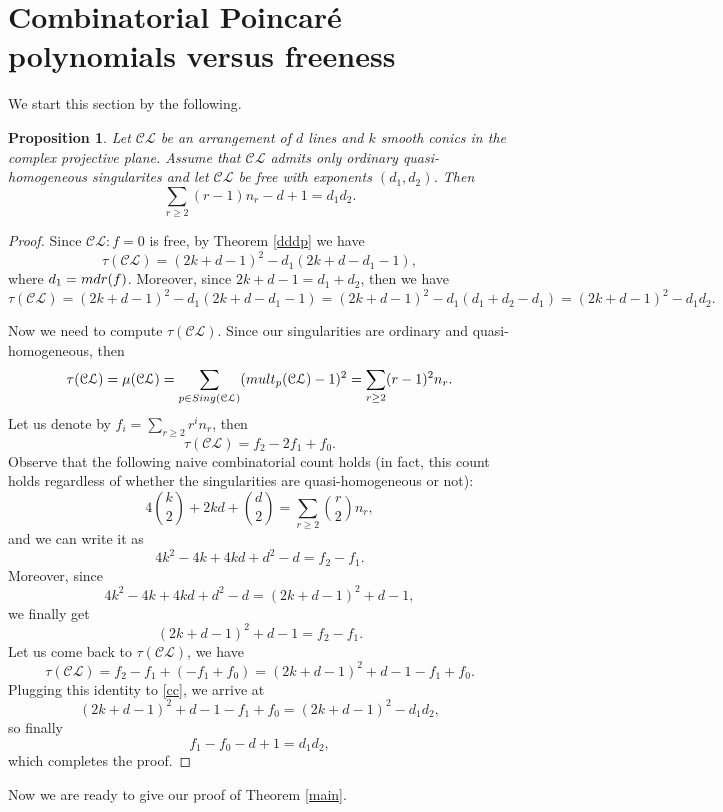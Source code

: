 \documentclass[12pt]{article}
\theoremstyle{plain}
\newtheorem{proposition}[thm]{Proposition}
\theoremstyle{definition}
\begin{document}
\section{Combinatorial Poincar\'e polynomials versus freeness}
We start this section by the following.
\begin{proposition}
\label{ccc}
Let $\mathcal{CL}$ be an arrangement of $d$ lines and $k$ smooth conics in the complex projective plane. Assume that $\mathcal{CL}$ admits only ordinary quasi-homogeneous singularites and let $\mathcal{CL}$ be free with exponents $(d_{1}, d_{2})$. Then
\begin{equation}
\sum_{r\geq 2}(r-1)n_{r} - d + 1 = d_{1}d_{2}.
\end{equation}
\end{proposition} 
\begin{proof}
Since $\mathcal{CL} : f = 0$ is free, by Theorem \ref{dddp} we have 
\begin{equation}
\label{cc}
\tau(\mathcal{CL}) = (2k+d-1)^{2} - d_{1}(2k+d-d_{1}-1),
\end{equation}
where $d_{1} = {\rm mdr}(f)$. Moreover, since $2k+d - 1 = d_{1}+d_{2}$, then we have
$$\tau(\mathcal{CL}) = (2k+d-1)^{2} - d_{1}(2k+d-d_{1}-1) = (2k+d-1)^{2} - d_{1}(d_{1}+d_{2}-d_{1}) = (2k+d-1)^{2} - d_{1}d_{2}.$$

Now we need to compute $\tau(\mathcal{CL})$. Since our singularities are ordinary and quasi-homogeneous, then
$$\tau(\mathcal{CL}) = \mu(\mathcal{CL}) = \sum_{p \in {\rm Sing}(\mathcal{CL})}({\rm mult}_{p}(\mathcal{CL})-1)^{2} = \sum_{r\geq 2}(r-1)^{2}n_{r}.$$
Let us denote by $f_{i} = \sum_{r\geq 2}r^{i}n_{r}$, then
$$\tau(\mathcal{CL}) = f_{2}-2f_{1} + f_{0}.$$
Observe that the following naive combinatorial count holds (in fact, this count holds regardless of whether the singularities are quasi-homogeneous or not):
$$4\binom{k}{2} + 2kd + \binom{d}{2} = \sum_{r\geq 2}\binom{r}{2}n_{r},$$
and we can write it as 
$$4k^{2}-4k + 4kd + d^{2} - d = f_{2}-f_{1}.$$
Moreover, since 
$$4k^{2}-4k + 4kd + d^{2} - d =(2k+d-1)^{2} + d - 1,$$
we finally get
$$(2k+d-1)^{2} + d - 1 = f_{2} - f_{1}.$$
Let us come back to $\tau(\mathcal{CL})$, we have
$$\tau(\mathcal{CL}) = f_{2} - f_{1} + (-f_{1}+f_{0}) = (2k+d-1)^{2} + d - 1 - f_{1}+f_{0}.$$
Plugging this identity to \eqref{cc}, we arrive at
$$(2k+d-1)^{2} + d - 1 - f_{1}+f_{0} = (2k+d-1)^{2} - d_{1}d_{2},$$
so finally
$$f_{1} - f_{0} - d + 1 = d_{1}d_{2},$$
which completes the proof.
\end{proof}
Now we are ready to give our proof of Theorem \ref{main}.
\end{document}
